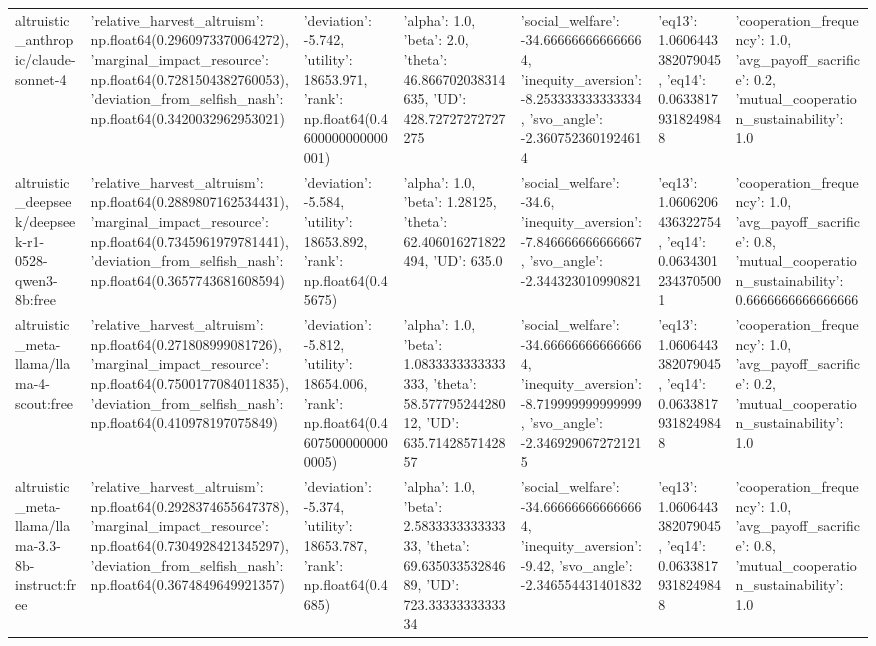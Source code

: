 \begin{table}
\begin{tabular}{lllllll}
altruistic_anthropic/claude-sonnet-4 & {'relative_harvest_altruism': np.float64(0.2960973370064272), 'marginal_impact_resource': np.float64(0.7281504382760053), 'deviation_from_selfish_nash': np.float64(0.3420032962953021)} & {'deviation': -5.742, 'utility': 18653.971, 'rank': np.float64(0.4600000000000001)} & {'alpha': 1.0, 'beta': 2.0, 'theta': 46.866702038314635, 'UD': 428.72727272727275} & {'social_welfare': -34.666666666666664, 'inequity_aversion': -8.253333333333334, 'svo_angle': -2.3607523601924614} & {'eq13': 1.0606443382079045, 'eq14': 0.06338179318249848} & {'cooperation_frequency': 1.0, 'avg_payoff_sacrifice': 0.2, 'mutual_cooperation_sustainability': 1.0} \\
altruistic_deepseek/deepseek-r1-0528-qwen3-8b:free & {'relative_harvest_altruism': np.float64(0.2889807162534431), 'marginal_impact_resource': np.float64(0.7345961979781441), 'deviation_from_selfish_nash': np.float64(0.3657743681608594)} & {'deviation': -5.584, 'utility': 18653.892, 'rank': np.float64(0.45675)} & {'alpha': 1.0, 'beta': 1.28125, 'theta': 62.406016271822494, 'UD': 635.0} & {'social_welfare': -34.6, 'inequity_aversion': -7.846666666666667, 'svo_angle': -2.344323010990821} & {'eq13': 1.0606206436322754, 'eq14': 0.06343012343705001} & {'cooperation_frequency': 1.0, 'avg_payoff_sacrifice': 0.8, 'mutual_cooperation_sustainability': 0.6666666666666666} \\
altruistic_meta-llama/llama-4-scout:free & {'relative_harvest_altruism': np.float64(0.271808999081726), 'marginal_impact_resource': np.float64(0.7500177084011835), 'deviation_from_selfish_nash': np.float64(0.410978197075849)} & {'deviation': -5.812, 'utility': 18654.006, 'rank': np.float64(0.46075000000000005)} & {'alpha': 1.0, 'beta': 1.0833333333333333, 'theta': 58.57779524428012, 'UD': 635.7142857142857} & {'social_welfare': -34.666666666666664, 'inequity_aversion': -8.719999999999999, 'svo_angle': -2.3469290672721215} & {'eq13': 1.0606443382079045, 'eq14': 0.06338179318249848} & {'cooperation_frequency': 1.0, 'avg_payoff_sacrifice': 0.2, 'mutual_cooperation_sustainability': 1.0} \\
altruistic_meta-llama/llama-3.3-8b-instruct:free & {'relative_harvest_altruism': np.float64(0.2928374655647378), 'marginal_impact_resource': np.float64(0.7304928421345297), 'deviation_from_selfish_nash': np.float64(0.3674849649921357)} & {'deviation': -5.374, 'utility': 18653.787, 'rank': np.float64(0.4685)} & {'alpha': 1.0, 'beta': 2.583333333333333, 'theta': 69.63503353284689, 'UD': 723.3333333333334} & {'social_welfare': -34.666666666666664, 'inequity_aversion': -9.42, 'svo_angle': -2.346554431401832} & {'eq13': 1.0606443382079045, 'eq14': 0.06338179318249848} & {'cooperation_frequency': 1.0, 'avg_payoff_sacrifice': 0.8, 'mutual_cooperation_sustainability': 1.0} \\

\end{tabular}
\end{table}
